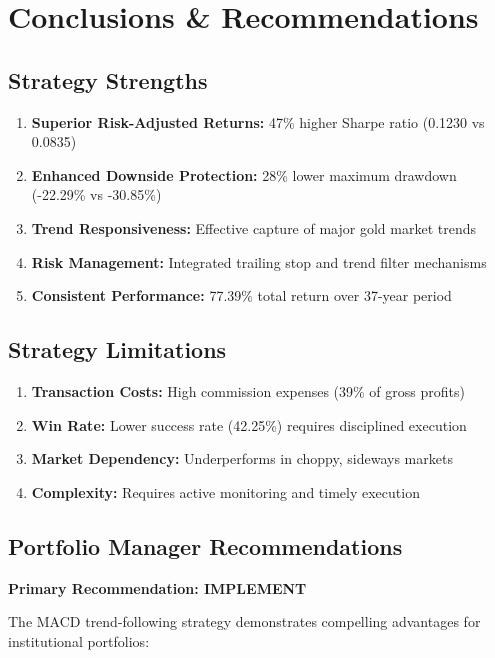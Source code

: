 \documentclass[11pt,a4paper]{article}
\begin{document}
\section{Conclusions \& Recommendations}

\subsection{Strategy Strengths}

\begin{enumerate}
    \item \textbf{Superior Risk-Adjusted Returns:} 47\% higher Sharpe ratio (0.1230 vs 0.0835)
    \item \textbf{Enhanced Downside Protection:} 28\% lower maximum drawdown (-22.29\% vs -30.85\%)
    \item \textbf{Trend Responsiveness:} Effective capture of major gold market trends
    \item \textbf{Risk Management:} Integrated trailing stop and trend filter mechanisms
    \item \textbf{Consistent Performance:} 77.39\% total return over 37-year period
\end{enumerate}

\subsection{Strategy Limitations}

\begin{enumerate}
    \item \textbf{Transaction Costs:} High commission expenses (39\% of gross profits)
    \item \textbf{Win Rate:} Lower success rate (42.25\%) requires disciplined execution
    \item \textbf{Market Dependency:} Underperforms in choppy, sideways markets
    \item \textbf{Complexity:} Requires active monitoring and timely execution
\end{enumerate}

\subsection{Portfolio Manager Recommendations}

\textbf{Primary Recommendation: IMPLEMENT}

The MACD trend-following strategy demonstrates compelling advantages for institutional portfolios:
\end{document}
